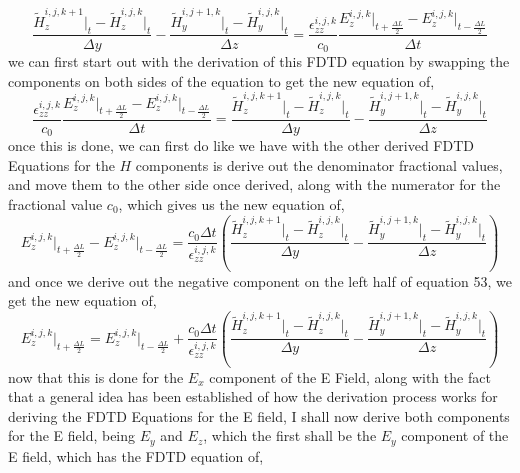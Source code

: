 \documentclass[]{article}
\begin{document}
\begin{equation}
\frac{\tilde{H}_{z}^{i,j,k+1} \Big|_t - \tilde{H}_{z}^{i,j,k}\Big|_t}{\Delta{y}} - \frac{\tilde{H}_{y}^{i, j + 1, k} \Big|_t - \tilde{H}_{y}^{i,j,k}\Big|_t}{\Delta{z}} = \frac{\epsilon_{zz}^{i,j,k}}{c_0} \frac{{E}_{z}^{i,j,k}\Big|_{t+\frac{\Delta{L}}{2}} -E_{z}^{i,j,k}\Big|_{t - \frac{\Delta{L}}{2}}}{\Delta{t}}
\end{equation} 
we can first start out with the derivation of this FDTD equation by swapping the components on both sides of the equation to get the new equation of,
\begin{equation}
\frac{\epsilon_{zz}^{i,j,k}}{c_0} \frac{{E}_{z}^{i,j,k}\Big|_{t+\frac{\Delta{L}}{2}} -E_{z}^{i,j,k}\Big|_{t - \frac{\Delta{L}}{2}}}{\Delta{t}} = \frac{\tilde{H}_{z}^{i,j,k+1} \Big|_t - \tilde{H}_{z}^{i,j,k}\Big|_t}{\Delta{y}} - \frac{\tilde{H}_{y}^{i, j + 1, k} \Big|_t - \tilde{H}_{y}^{i,j,k}\Big|_t}{\Delta{z}}
\end{equation}
once this is done, we can first do like we have with the other derived FDTD Equations for the $H$ components is derive out the denominator fractional values, and move them to the other side once derived, along with the numerator for the fractional value $c_0$, which gives us the new equation of,
\begin{equation}
{E}_{z}^{i,j,k}\Big|_{t+\frac{\Delta{L}}{2}} -E_{z}^{i,j,k}\Big|_{t - \frac{\Delta{L}}{2}} = \frac{c_0\Delta{t}}{\epsilon_{zz}^{i,j,k}} \left( \frac{\tilde{H}_{z}^{i,j,k+1} \Big|_t - \tilde{H}_{z}^{i,j,k}\Big|_t}{\Delta{y}} - \frac{\tilde{H}_{y}^{i, j + 1, k} \Big|_t - \tilde{H}_{y}^{i,j,k}\Big|_t}{\Delta{z}}\right)
\end{equation}
and once we derive out the negative component on the left half of equation 53, we get the new equation of,
\begin{equation}
{E}_{z}^{i,j,k}\Big|_{t+\frac{\Delta{L}}{2}} = E_{z}^{i,j,k}\Big|_{t - \frac{\Delta{L}}{2}} + \frac{c_0\Delta{t}}{\epsilon_{zz}^{i,j,k}} \left( \frac{\tilde{H}_{z}^{i,j,k+1} \Big|_t - \tilde{H}_{z}^{i,j,k}\Big|_t}{\Delta{y}} - \frac{\tilde{H}_{y}^{i, j + 1, k} \Big|_t - \tilde{H}_{y}^{i,j,k}\Big|_t}{\Delta{z}}\right)
\end{equation}
now that this is done for the $E_x$ component of the E Field, along with the fact that a general idea has been established of how the derivation process works for deriving the FDTD Equations for the E field, I shall now derive both components for the E field, being $E_y$ and $E_z$, which the first shall be the $E_y$ component of the E field, which has the FDTD equation of, 
\end{document}

